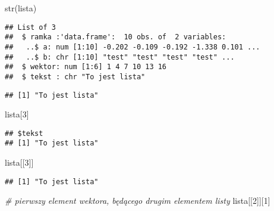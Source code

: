 \documentclass[
]{book}
\newenvironment{Shaded}{\begin{snugshade}}{\end{snugshade}}
\newcommand{\CommentTok}[1]{\textcolor[rgb]{0.56,0.35,0.01}{\textit{#1}}}
\newcommand{\DecValTok}[1]{\textcolor[rgb]{0.00,0.00,0.81}{#1}}
\newcommand{\FunctionTok}[1]{\textcolor[rgb]{0.00,0.00,0.00}{#1}}
\newcommand{\NormalTok}[1]{#1}
\newcommand{\SpecialCharTok}[1]{\textcolor[rgb]{0.00,0.00,0.00}{#1}}
\begin{document}
\begin{Shaded}
\begin{Highlighting}[]
\FunctionTok{str}\NormalTok{(lista)}
\end{Highlighting}
\end{Shaded}

\begin{verbatim}
## List of 3
##  $ ramka :'data.frame':  10 obs. of  2 variables:
##   ..$ a: num [1:10] -0.202 -0.109 -0.192 -1.338 0.101 ...
##   ..$ b: chr [1:10] "test" "test" "test" "test" ...
##  $ wektor: num [1:6] 1 4 7 10 13 16
##  $ tekst : chr "To jest lista"
\end{verbatim}

\begin{Shaded}
\end{Shaded}

\begin{verbatim}
## [1] "To jest lista"
\end{verbatim}

\begin{Shaded}
\begin{Highlighting}[]
\NormalTok{lista[}\DecValTok{3}\NormalTok{]}
\end{Highlighting}
\end{Shaded}

\begin{verbatim}
## $tekst
## [1] "To jest lista"
\end{verbatim}

\begin{Shaded}
\begin{Highlighting}[]
\NormalTok{lista[[}\DecValTok{3}\NormalTok{]]}
\end{Highlighting}
\end{Shaded}

\begin{verbatim}
## [1] "To jest lista"
\end{verbatim}

\begin{Shaded}
\begin{Highlighting}[]
\CommentTok{\# pierwszy element wektora, będącego drugim elementem listy}
\NormalTok{lista[[}\DecValTok{2}\NormalTok{]][}\DecValTok{1}\NormalTok{]}
\end{Highlighting}
\end{Shaded}
\end{document}
